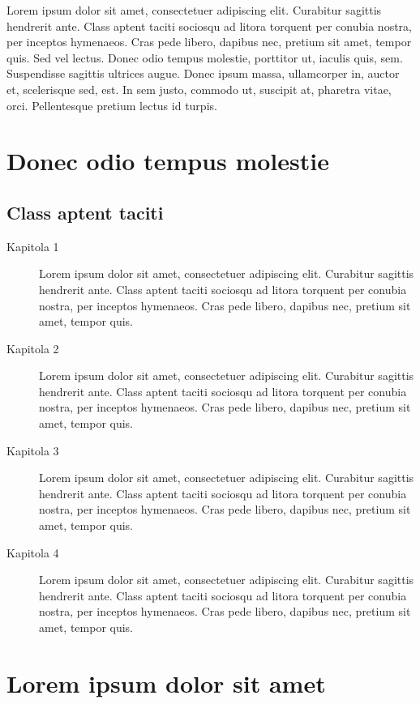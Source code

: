 Lorem ipsum dolor sit amet, consectetuer adipiscing elit. Curabitur sagittis hendrerit ante. Class aptent taciti sociosqu ad litora torquent per conubia nostra, per inceptos hymenaeos. Cras pede libero, dapibus nec, pretium sit amet, tempor quis. Sed vel lectus. Donec odio tempus molestie, porttitor ut, iaculis quis, sem. Suspendisse sagittis ultrices augue. Donec ipsum massa, ullamcorper in, auctor et, scelerisque sed, est. In sem justo, commodo ut, suscipit at, pharetra vitae, orci. Pellentesque pretium lectus id turpis. \cite{Kopka2004}

\section{Donec odio tempus molestie}

\lipsum[2] \cite{def:1, def:2}

\subsection{Class aptent taciti}

\lipsum[2-3]

\begin{description}
  \item[Kapitola 1] Lorem ipsum dolor sit amet, consectetuer adipiscing elit. Curabitur sagittis hendrerit ante. Class aptent taciti sociosqu ad litora torquent per conubia nostra, per inceptos hymenaeos. Cras pede libero, dapibus nec, pretium sit amet, tempor quis.

  \item[Kapitola 2] Lorem ipsum dolor sit amet, consectetuer adipiscing elit. Curabitur sagittis hendrerit ante. Class aptent taciti sociosqu ad litora torquent per conubia nostra, per inceptos hymenaeos. Cras pede libero, dapibus nec, pretium sit amet, tempor quis.

  \item[Kapitola 3] Lorem ipsum dolor sit amet, consectetuer adipiscing elit. Curabitur sagittis hendrerit ante. Class aptent taciti sociosqu ad litora torquent per conubia nostra, per inceptos hymenaeos. Cras pede libero, dapibus nec, pretium sit amet, tempor quis.

  \item[Kapitola 4] Lorem ipsum dolor sit amet, consectetuer adipiscing elit. Curabitur sagittis hendrerit ante. Class aptent taciti sociosqu ad litora torquent per conubia nostra, per inceptos hymenaeos. Cras pede libero, dapibus nec, pretium sit amet, tempor quis.
\end{description}

\lipsum[2]

\section{Lorem ipsum dolor sit amet}

\lipsum[3-5]
